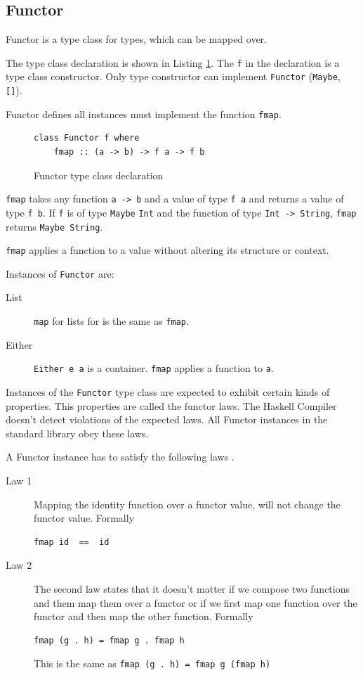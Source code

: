 \documentclass[twoside, a4paper, 12pt]{article}
\begin{document}
\subsection{Functor}
\label{sec:functor}

Functor is a type class for types, which can be mapped over. 

The type class declaration is shown in Listing \ref{fig:functordeclaration}.
The \verb|f| in the declaration is a type class constructor. Only type constructor can implement \verb|Functor| (\verb|Maybe|, \verb|[]|).

Functor defines all instances must implement the function \verb|fmap|.
\begin{figure}
  \centering
\begin{verbatim}
class Functor f where
    fmap :: (a -> b) -> f a -> f b
\end{verbatim}
  \caption{Functor type class declaration}
  \label{fig:functordeclaration}
\end{figure}

\verb|fmap| takes any function \verb|a -> b| and a value of type \verb|f a| and returns a value of type \verb|f b|. 
If \verb|f| is of type \verb|Maybe| \verb|Int| and the function of type \verb|Int -> String|, \verb|fmap| returns \verb|Maybe String|. 

\verb|fmap| applies a function to a value without altering its structure or context.

Instances of \verb|Functor| are:

\begin{description}
\item[List] \verb|map| for lists for is the same as \verb|fmap|.
\item[Either] \verb|Either e a| is a container. \verb|fmap| applies a function to \verb|a|.
\end{description}

Instances of the \verb|Functor| type class are expected to exhibit certain kinds of properties. This properties are called the functor laws.
The Haskell Compiler doesn't detect violations of the expected laws. All Functor instances in the standard library obey these laws.

A Functor instance has to satisfy the following laws \cite{Marlow_2010}.

\begin{description}
\item[Law 1] Mapping the identity function over a functor value, will not change the functor value. Formally
\begin{verbatim}
fmap id  ==  id
\end{verbatim}
\item[Law 2] The second law states that it doesn't matter if we compose two functions and them map them over a functor or if we first map one function over the functor and then map the other function. Formally
\begin{verbatim}
fmap (g . h) = fmap g . fmap h
\end{verbatim}
This is the same as \verb|fmap (g . h) = fmap g (fmap h)|
\end{description}
\end{document}
